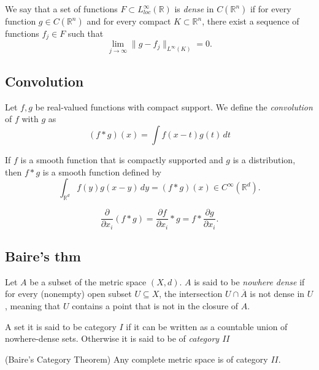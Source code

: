 \documentclass[../main.tex]{subfiles}
\begin{document}
\begin{definition}We say that a set of functions $F\subset L_{loc}^{\infty}(\mathbb{R})$ is \emph{dense} in $C(\mathbb{R}^n)$ if for every function $g\in C(\mathbb{R}^n)$ and for every compact $K\subset \mathbb{R}^n$, there exist a sequence of functions $f_j\in F$ such that $$\lim_{j\rightarrow\infty} \|g-f_j\|_{L^\infty(K)}=0.$$ 
\end{definition}

\subsection{Convolution}
\begin{definition}
	Let $f,g$ be real-valued functions with compact support. We define the \emph{convolution} of $f$ with $g$ as $$(f\ast g)(x)=\int f(x-t)g(t) \, dt$$
\end{definition}


\begin{propo}
	If $f$ is a smooth function that is compactly supported and $g$ is a distribution, then $f\ast g$ is a smooth function defined by
	$${\displaystyle \int _{\mathbb {R} ^{d}}{f}(y)g(x-y)\,dy=(f*g)(x)\in C^{\infty }(\mathbb {R} ^{d}).} $$ \label{prop:29}
\end{propo}
\begin{propo} \label{prop:2}
	$${\frac {\partial }{\partial x_{i}}}(f*g)={\frac {\partial f}{\partial x_{i}}}*g=f*{\frac {\partial g}{\partial x_{i}}}.$$
\end{propo}

\subsection{Baire's thm}

\begin{definition} Let $A$ be a subset of the metric space $(X,d)$. $A$ is said to be \emph{nowhere dense} if for every (nonempty) open subset $U\subseteq X$, the intersection $U\cap\overline{A}$ is not dense in $U$, meaning that $U$ contains a point that is not in the closure of $A$.
\end{definition}

\begin{definition}
	A set it is said to be category $I$ if it can be written as a countable union of nowhere-dense sets. Otherwise it is said to be of \emph{category $II$}
\end{definition}
\begin{theorem} (Baire's Category Theorem) \label{baire}
	Any complete metric space is of category $II$.
\end{theorem}
\end{document}
